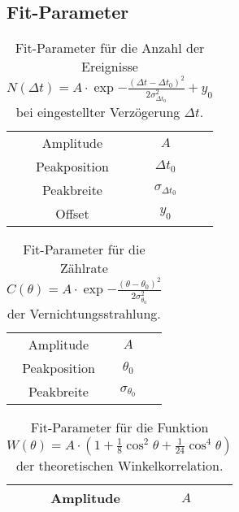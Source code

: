 \subsection{Fit-Parameter}
\label{sec:fitval}

\begin{table}[H]
	\centering
	\caption{Fit-Parameter für die Anzahl der Ereignisse $N(\Delta t) = A \cdot \exp{-\frac{(\Delta t - \Delta t_0)^2}{2 \sigma_{\Delta t_0}^2}} + y_0$ bei eingestellter Verzögerung $\Delta t$.}
	\label{fig:fitval1}
	\begin{tabular}{cc|c}
		\toprule
		Amplitude & $A$ &  \\
		Peakposition & $\Delta t_0$ &  \\
		Peakbreite & $\sigma_{\Delta t_0}$ &  \\
		Offset & $y_0$ & \\ \bottomrule
	\end{tabular}
\end{table}

\begin{table}[H]
	\centering
	\caption{Fit-Parameter für die Zählrate $C(\theta) = A \cdot \exp{-\frac{(\theta - \theta_0)^2}{2 \sigma_{\theta_0}^2}}$ der Vernichtungsstrahlung.}
	\label{fig:fitval3}
	\begin{tabular}{cc|c}
		\toprule
		Amplitude & $A$ &  \\
		Peakposition & $\theta_0$ &  \\
		Peakbreite & $\sigma_{\theta_0}$ &  \\ \bottomrule
	\end{tabular}
\end{table}

\begin{table}[H]
	\centering
	\caption{Fit-Parameter für die Funktion $W(\theta) = A \cdot \left( 1 + \frac{1}{8} \cos^2 \theta + \frac{1}{24} \cos^4 \theta \right)$ der theoretischen Winkelkorrelation.}
	\label{fig:fitval4}
	\begin{tabular}{cc|c}
		\toprule
		Amplitude & $A$ &  \\ \bottomrule
	\end{tabular}
\end{table}

